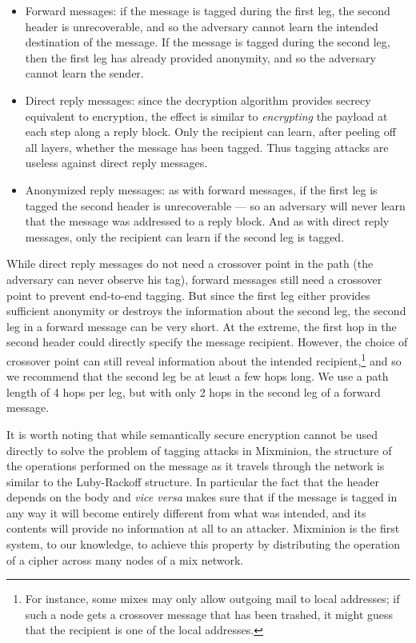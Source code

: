 \documentclass[11pt]{IEEEtran}
\begin{document}
\begin{itemize}
\item Forward messages: if the message is tagged during the first leg,
the second header is unrecoverable, and so the adversary cannot
learn the intended destination of the message. If the message is tagged
during the second leg, then the first leg has already provided anonymity,
and so the adversary cannot learn the sender.
\item Direct reply messages: since the decryption algorithm provides
secrecy equivalent to encryption, the effect is similar to {\em encrypting}
the payload at each step along a reply block. Only the recipient can learn,
after peeling off all layers, whether the message has been tagged. Thus
tagging attacks are useless against direct reply messages.
\item Anonymized reply messages: as with forward messages, if the first leg
is tagged the second header is unrecoverable --- so an adversary will
never learn that the message was addressed to a reply block. And as with
direct reply messages, only the recipient can learn if the second leg is
tagged.
\end{itemize}

While direct reply messages do not need a crossover point in the path
(the adversary can never observe his tag), forward messages still need a
crossover point to prevent end-to-end tagging. But since the first leg
either provides sufficient anonymity or destroys the information about
the second leg, the second leg in a forward message can be very short.
At the extreme, the first hop in the second header could directly
specify the message recipient. However, the choice of crossover point
can still reveal information about the intended recipient,\footnote{For instance,
some mixes may only allow outgoing mail to local addresses; if such a
node gets a crossover message that has been trashed, it might guess
that the recipient is one of the local addresses.} and so we recommend
that the second leg be at least a few hops long.
We use a path length of 4 hops per leg, but with only 2 hops in the
second leg of a forward message.

It is worth noting that while semantically secure encryption cannot be
used directly to solve the problem of tagging attacks in Mixminion, the
structure of the operations performed on the message as it travels
through the network is similar to the Luby-Rackoff \cite{sprp}
structure. In particular the fact that the header depends on the body
and \emph{vice versa} makes sure that if the message is tagged in
any way it will become entirely different from what was intended, and
its contents
will provide no information at all to an attacker. Mixminion is the
first system, to our knowledge, to achieve this property by
distributing the operation of a cipher across many nodes of a mix network.
\end{document}
